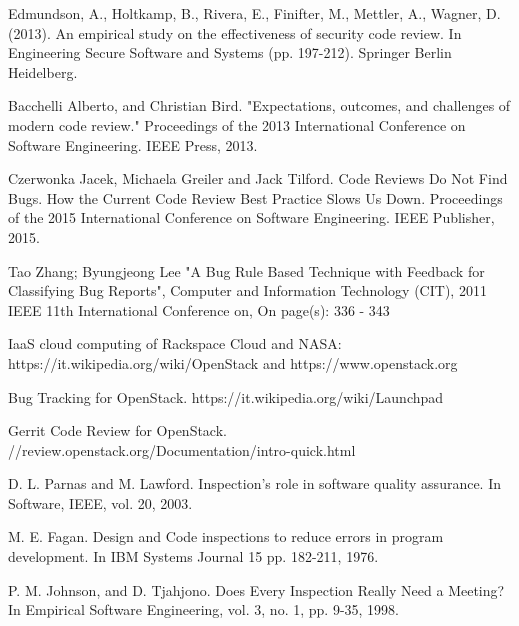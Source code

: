 %
%

%
% 
% 
%
\begin{thebibliography}{99.}
%
%
%
 Edmundson, A., Holtkamp, B., Rivera, E., Finifter, M., Mettler, A., Wagner, D. (2013). 
An empirical study on the effectiveness of security code review. In Engineering Secure Software and Systems 
(pp. 197-212). Springer Berlin Heidelberg.

 Bacchelli Alberto, and Christian Bird. 
"Expectations, outcomes, and challenges of modern code review." 
Proceedings of the 2013 International Conference on Software Engineering. IEEE Press, 2013.

 Czerwonka Jacek, Michaela Greiler and Jack Tilford. Code Reviews Do Not Find Bugs. 
How the Current Code Review Best Practice Slows Us Down. 
Proceedings of the 2015 International Conference on Software Engineering. IEEE Publisher, 2015.

 Tao Zhang; Byungjeong Lee "A Bug Rule Based Technique with Feedback for Classifying Bug Reports",  
Computer and Information Technology (CIT), 2011 IEEE 11th International Conference on, On page(s): 336 - 343 

 IaaS cloud computing of Rackspace Cloud and NASA: https://it.wikipedia.org/wiki/OpenStack and 
https://www.openstack.org

 Bug Tracking for OpenStack. https://it.wikipedia.org/wiki/Launchpad

 Gerrit Code Review for OpenStack. //review.openstack.org/Documentation/intro-quick.html

 D. L. Parnas and M. Lawford. Inspection's role in software quality assurance. In 
Software, IEEE,  vol. 20, 2003. 

 M. E. Fagan. Design and Code inspections to reduce errors in program development. In IBM Systems Journal 15 
pp. 182-211, 1976. 

 P. M. Johnson, and D. Tjahjono. Does Every Inspection Really Need a Meeting? In Empirical Software Engineering, vol. 3, 
no. 1, pp. 9-35, 1998. 


\end{thebibliography}
